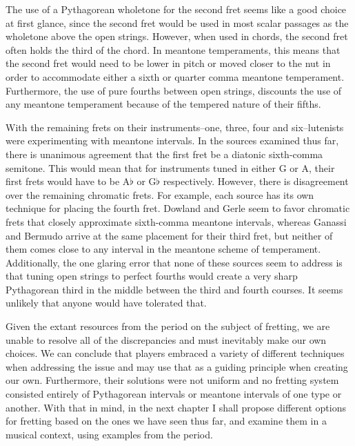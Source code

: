 The use of a Pythagorean wholetone for the second fret seems like a good choice at
first glance, since the second fret would be used in most scalar passages as the
wholetone above the open strings.  However, when used in chords, the second fret often
holds the third of the chord. In meantone temperaments, this means that the second
fret would need to be lower in pitch or moved closer to the nut in order to accommodate
either a sixth or quarter comma meantone temperament.  Furthermore, the use of pure
fourths between open strings, discounts the use of any meantone temperament because of
the tempered nature of their fifths.

With the remaining frets on their instruments--one, three, four and six--lutenists were
experimenting with meantone intervals. In the sources examined thus far, there is unanimous
agreement that the first fret be a diatonic sixth-comma semitone.  This would mean that for
instruments tuned in either G or A, their first frets would have to be A$\flat$ or G$\flat$
respectively. However, there is disagreement over the remaining chromatic frets. For example, each
source has its own technique for placing the fourth fret.  Dowland and Gerle seem to favor chromatic
frets that closely approximate sixth-comma meantone intervals, whereas Ganassi and Bermudo arrive at
the same placement for their third fret, but neither of them comes close to any interval in the
meantone scheme of temperament. Additionally, the one glaring error that none of these sources seem
to address is that tuning open strings to perfect fourths would create a very sharp Pythagorean
third in the middle between the third and fourth courses.  It seems unlikely that anyone would have
tolerated that.

Given the extant resources from the period on the subject of fretting, we are unable to resolve all
of the discrepancies and must inevitably make our own choices.  We can conclude that players
embraced a variety of different techniques when addressing the issue and may use that as a guiding
principle when creating our own. Furthermore, their solutions were not uniform and no fretting
system consisted entirely of Pythagorean intervals or meantone intervals of one type or another.
With that in mind, in the next chapter I shall propose different options for fretting based on the
ones we have seen thus far, and examine them in a musical context, using examples from the period.
